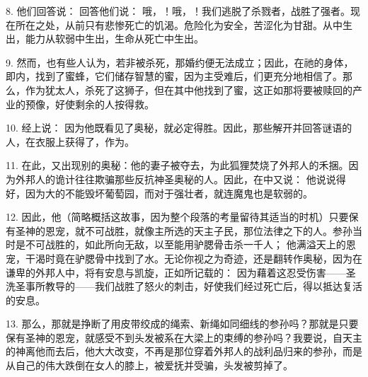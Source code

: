 8. 他们回答说： 回答他们说： 哦，！哦，！我们逃脱了杀戮者，战胜了强者。现在所在之处，从前只有悲惨死亡的饥渴。危险化为安全，苦涩化为甘甜。从中生出，能力从软弱中生出，生命从死亡中生出。\par

9. 然而，也有些人认为，若非被杀死，那婚约便无法成立；因此，在祂的身体，即内，找到了蜜蜂，它们储存智慧的蜜，因为主受难后，们更充分地相信了。那么，作为犹太人，杀死了这狮子，但在其中他找到了蜜，这正如那将要被赎回的产业的预像，好使剩余的人按得救。\par

10. 经上说： 因为他既看见了奥秘，就必定得胜。因此，那些解开并回答谜语的人，在衣服上获得了，作为。\par

11. 在此，又出现别的奥秘：他的妻子被夺去，为此狐狸焚烧了外邦人的禾捆。因为外邦人的诡计往往欺骗那些反抗神圣奥秘的人。因此，在中又说： 他说说得好，因为大的不能毁坏葡萄园，而对于强壮者，就连魔鬼也是软弱的。\par

12. 因此，他（简略概括这故事，因为整个段落的考量留待其适当的时机）只要保有圣神的恩宠，就不可战胜，就像主所选的天主子民，那位法律之下的人。参孙当时是不可战胜的，如此所向无敌，以至能用驴腮骨击杀一千人； 他满溢天上的恩宠，干渴时竟在驴腮骨中找到了水。无论你视之为奇迹，还是翻转作奥秘，因为在谦卑的外邦人中，将有安息与凯旋，正如所记载的： 因为藉着这忍受伤害——圣洗圣事所教导的——我们战胜了怒火的刺击，好使我们经过死亡后，得以抵达复活的安息。\par

13. 那么，那就是挣断了用皮带绞成的绳索、新绳如同细线的参孙吗？那就是只要保有圣神的恩宠，就感受不到头发被系在大梁上的束缚的参孙吗？我要说，自天主的神离他而去后，他大大改变，不再是那位穿着外邦人的战利品归来的参孙，而是从自己的伟大跌倒在女人的膝上，被爱抚并受骗，头发被剪掉了。\par

